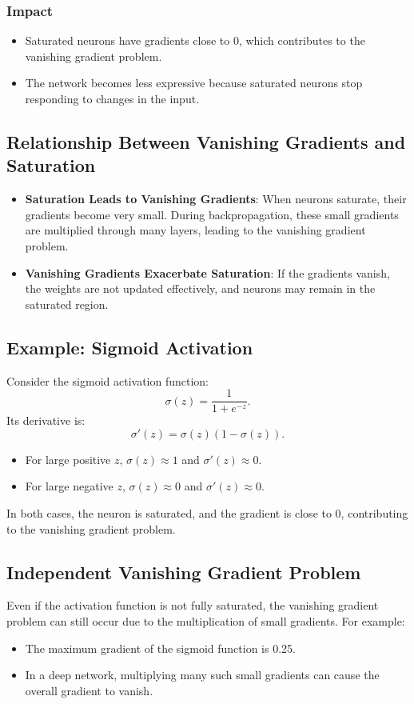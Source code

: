 \begin{notechapter}
\subsubsection{Impact}
\begin{itemize}[leftmargin=*]
    \item Saturated neurons have gradients close to 0, which contributes to the
    vanishing gradient problem.
    \item The network becomes less expressive because saturated neurons stop
    responding to changes in the input.
\end{itemize}

\subsection{Relationship Between Vanishing Gradients and Saturation}
\begin{itemize}[leftmargin=*]
    \item \textbf{Saturation Leads to Vanishing Gradients}: When neurons saturate,
    their gradients become very small. During backpropagation, these small gradients
    are multiplied through many layers, leading to the vanishing gradient problem.
    \item \textbf{Vanishing Gradients Exacerbate Saturation}: If the gradients vanish,
    the weights are not updated effectively, and neurons may remain in the saturated
    region.
\end{itemize}

\subsection{Example: Sigmoid Activation}
Consider the sigmoid activation function:
\[
\sigma(z) = \frac{1}{1 + e^{-z}}.
\]
Its derivative is:
\[
\sigma'(z) = \sigma(z) (1 - \sigma(z)).
\]
\begin{itemize}[leftmargin=*]
    \item For large positive \(z\), \(\sigma(z) \approx 1\) and \(\sigma'(z) \approx 0\).
    \item For large negative \(z\), \(\sigma(z) \approx 0\) and \(\sigma'(z) \approx 0\).
\end{itemize}
In both cases, the neuron is saturated, and the gradient is close to 0, contributing
to the vanishing gradient problem.

\subsection{Independent Vanishing Gradient Problem}
Even if the activation function is not fully saturated, the vanishing gradient problem
can still occur due to the multiplication of small gradients. For example:
\begin{itemize}[leftmargin=*]
    \item The maximum gradient of the sigmoid function is 0.25.
    \item In a deep network, multiplying many such small gradients can cause the
    overall gradient to vanish.
\end{itemize}


\end{notechapter}
